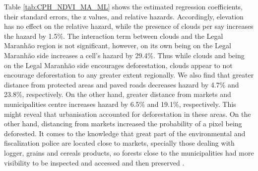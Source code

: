 Table \ref{tab:CPH_NDVI_MA_ML} shows the estimated regression coefficients, their standard errors, the z values, and relative hazards. Accordingly, elevation has no effect on the relative hazard, while the presence of clouds per say increases the hazard by 1.5\%. The interaction term between clouds and the Legal Maranhão region is not significant, however, on its own being on the Legal Maranhão side increases a cell's hazard by 29.4\%.  Thus while clouds and being on the Legal Maranhão side encourages deforestation, clouds appear to not encourage deforestation to any greater extent regionally.  We also find that greater distance from protected areas and paved roads decreases hazard by 4.7\% and 23.8\%, respectively. On the other hand, greater distance from markets and municipalities centre increases hazard by 6.5\% and 19.1\%, respectively. This might reveal that urbanisation accounted for deforestation in these areas. On the other hand, distancing from markets increased the probability of a pixel being deforested. It comes to the knowledge that great part of the environmental and fiscalization police are located close to markets, specially those dealing with logger, grains and cereals products, so forests close to the municipalities had more visibility to be inspected and accessed and then preserved \citep{rural_2018}. 

